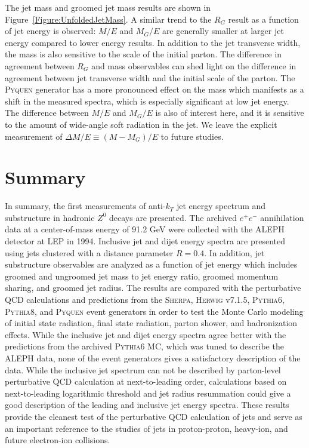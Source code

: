 \documentclass[aps,preprint,superscriptaddress,groupedaddress]{revtex4}  %
\newcommand{\Rg}{\ensuremath{R_G}\xspace}
\newcommand{\ME}{\ensuremath{M/E}\xspace}
\newcommand{\MgE}{\ensuremath{M_G/E}\xspace}
\newcommand{\sherpa}{\textsc{Sherpa}\xspace}
\newcommand{\herwig}{\textsc{Herwig}\xspace}
\newcommand{\pythia}[1]{\textsc{Pythia}{#1}\xspace}
\newcommand{\pyquen}{\textsc{Pyquen}\xspace}
\begin{document}
The jet mass and groomed jet mass results are shown in Figure~\ref{Figure:UnfoldedJetMass}.  A similar trend to the \Rg result as a function of jet energy is observed: \ME and \MgE are generally smaller at larger jet energy compared to lower energy results.  In addition to the jet transverse width, the mass is also sensitive to the scale of the initial parton.  The difference in agreement between \Rg and mass observables can shed light on the difference in agreement between jet transverse width and the initial scale of the parton.  The \pyquen generator has a more pronounced effect on the mass which manifests as a shift in the measured spectra, which is especially significant at low jet energy.  The difference between \ME and \MgE is also of interest here, and it is sensitive to the amount of wide-angle soft radiation in the jet.  We leave the explicit measurement of $\Delta M/E \equiv (M-M_G)/E$ to future studies.



\section{\label{Section:Summary}Summary}
In summary, the first measurements of anti-$k_{T}$ jet energy spectrum and substructure in hadronic $Z^0$ decays are presented. The archived $e^+e^-$ annihilation data at a center-of-mass energy of 91.2 GeV were collected with the ALEPH detector at LEP in 1994. Inclusive jet and dijet energy spectra are presented using jets clustered with a distance parameter $R=0.4$. In addition, jet substructure observables are analyzed as a function of jet energy which includes groomed and ungroomed jet mass to jet energy ratio, groomed momentum sharing, and groomed jet radius. The results are compared with the perturbative QCD calculations and predictions from the \sherpa, \herwig v7.1.5, \pythia{6}, \pythia{8}, and \pyquen event generators in order to test the Monte Carlo modeling of initial state radiation, final state radiation, parton shower, and hadronization effects.
While the inclusive jet and dijet energy spectra agree better with the predictions from the archived \pythia{6} MC, which was tuned to describe the ALEPH data, none of the event generators gives a satisfactory description of the data.
While the inclusive jet spectrum can not be described by parton-level perturbative QCD calculation at next-to-leading order, calculations based on next-to-leading logarithmic threshold and jet radius resummation could give a good description of the leading and inclusive jet energy spectra.
These results provide the cleanest test of the perturbative QCD calculation of jets and serve as an important reference to the studies of jets in proton-proton, heavy-ion, and future electron-ion collisions.
\end{document}
